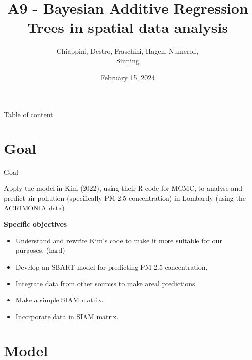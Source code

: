 \documentclass[10pt]{beamer}
\title{A9 - Bayesian Additive Regression \\ Trees in spatial data analysis}
\author{Chiappini, Destro, Fraschini, Hagen, Numeroli, \\ Sinning}
\date{February 15, 2024}
\begin{document}
\begin{frame}
    \maketitle
\end{frame}

\begin{frame}{Table of content}
    \tableofcontents
\end{frame}


\section{Goal}

\begin{frame}{Goal}

    Apply the model in Kim (2022), using their R code for MCMC, to analyse and predict air pollution (specifically PM 2.5 concentration) in Lombardy (using the AGRIMONIA data).

    \vspace{0.2cm}
    \textbf{Specific objectives}
    \begin{itemize}
        \item Understand and rewrite Kim's code to make it more suitable for our purposes. (hard)
        \item Develop an SBART model for predicting PM 2.5 concentration.
        \item Integrate data from other sources to make areal predictions.
        \item Make a simple SIAM matrix.
        \item Incorporate data in SIAM matrix.
    \end{itemize}
\end{frame}

\section{Model}
\end{document}
